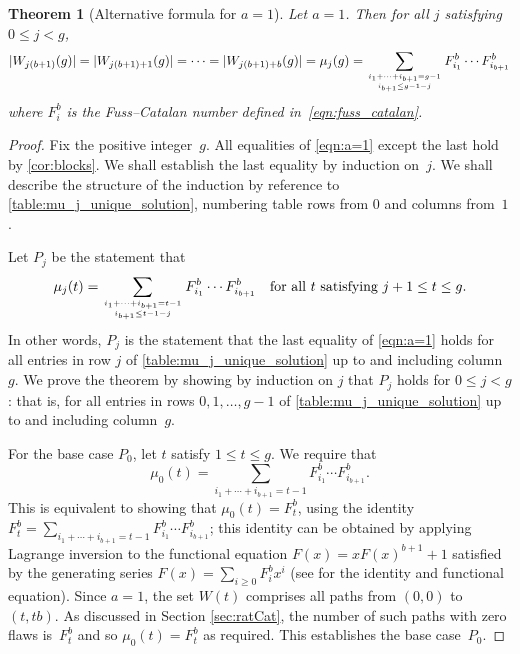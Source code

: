 \documentclass[11pt]{article}
\newtheorem{thm}{Theorem}[section] %
\theoremstyle{definition} %
\numberwithin{equation}{section}
\newcommand{\myatop}[2]{\genfrac{}{}{0pt}{}{#1}{#2}}
\begin{document}
\begin{thm}[Alternative formula for $a=1$]
    \label{thm:path_counting_aisone_case}
        Let $a=1$. Then for all $j$ satisfying $0 \leq j < g$,
           \begin{equation}
		\label{eqn:a=1}
                |W_{j(b+1)}(g)| = |W_{j(b+1)+1}(g)| = \cdots = |W_{j(b+1)+b}(g)| = \mu_j(g) = \sum_{\myatop{i_1 + \cdots + i_{b+1} = g-1}{i_{b+1} \leq g-1-j}} F_{i_1}^b  \cdots F_{i_{b+1}}^b
            \end{equation}
where $F_i^b$ is the Fuss--Catalan number 
defined in~\eqref{eqn:fuss_catalan}.
\end{thm}
   
\begin{proof}
Fix the positive integer~$g$. All equalities of \eqref{eqn:a=1} except the last hold by \cref{cor:blocks}. 
We shall establish the last equality by induction on~$j$.
We shall describe the structure of the induction by reference to \cref{table:mu_j_unique_solution}, numbering table rows from $0$ and columns from~$1$.

Let $P_j$ be the statement that 
\[
\mu_j(t) = \sum_{\myatop{i_1 + \cdots + i_{b+1} = t-1}{i_{b+1} \leq t-1-j}} F_{i_1}^b  \cdots F_{i_{b+1}}^b \quad \mbox{for all $t$ satisfying $j+1 \le t \le g$}.
\]
In other words, $P_j$ is the statement that 
 the last equality of \eqref{eqn:a=1} holds for all entries in row $j$ of \cref{table:mu_j_unique_solution} up to and including column~$g$.
We prove the theorem by showing by induction on $j$ that $P_j$ holds for $0 \le j < g$: that is, for all entries in rows $0, 1, \dots, g-1$ of \cref{table:mu_j_unique_solution} up to and including column~$g$. 

For the base case $P_0$, let $t$ satisfy $1 \le t \le g$. We require that
\[
\mu_0(t) = \sum_{i_1 + \cdots + i_{b+1} = t-1} F_{i_1}^b  \cdots F_{i_{b+1}}^b. 
\]
This is equivalent to showing that $\mu_0(t) = F_t^b$, using the identity $F_t^b = \sum_{i_1 + \cdots + i_{b+1} = t-1} F_{i_1}^b \cdots F_{i_{b+1}}^b$;
this identity  can be obtained by applying Lagrange inversion \cite[Theorem 1.2.4]{goul} to the functional equation $F(x) = xF(x)^{b+1} + 1$ satisfied by the generating series $F(x) = \sum_{i\geq0} F_i^b x^i$  (see \cite[p.~362]{graham1994concrete} for the identity and functional equation). 
Since $a=1$, the set $W(t)$ comprises all paths from $(0,0)$ to~$(t,tb)$. As discussed in Section \ref{sec:ratCat},
the number of such paths with zero flaws is~$F_t^b$ and so $\mu_0(t) = F_t^b$ as required. This establishes the base case~$P_0$. 


\end{proof}
\end{document}

